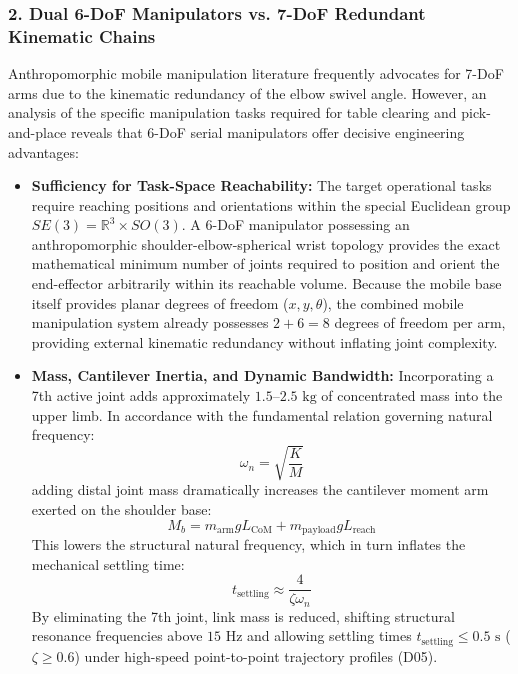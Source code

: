 \subsubsection{2. Dual 6-DoF Manipulators vs. 7-DoF Redundant Kinematic Chains}
Anthropomorphic mobile manipulation literature frequently advocates for 7-DoF arms due to the kinematic redundancy of the elbow swivel angle. However, an analysis of the specific manipulation tasks required for table clearing and pick-and-place reveals that 6-DoF serial manipulators offer decisive engineering advantages:
\begin{itemize}[leftmargin=1.5em]
  \item \textbf{Sufficiency for Task-Space Reachability:} The target operational tasks require reaching positions and orientations within the special Euclidean group $SE(3) = \mathbb{R}^3 \times SO(3)$. A 6-DoF manipulator possessing an anthropomorphic shoulder-elbow-spherical wrist topology provides the exact mathematical minimum number of joints required to position and orient the end-effector arbitrarily within its reachable volume. Because the mobile base itself provides planar degrees of freedom ($x, y, \theta$), the combined mobile manipulation system already possesses $2 + 6 = 8$ degrees of freedom per arm, providing external kinematic redundancy without inflating joint complexity.
  \item \textbf{Mass, Cantilever Inertia, and Dynamic Bandwidth:} Incorporating a 7th active joint adds approximately $1.5\text{--}2.5\text{ kg}$ of concentrated mass into the upper limb. In accordance with the fundamental relation governing natural frequency:
  \begin{equation}
    \omega_n = \sqrt{\frac{K}{M}}
  \end{equation}
  adding distal joint mass dramatically increases the cantilever moment arm exerted on the shoulder base:
  \begin{equation}
    M_b = m_{\text{arm}} g L_{\text{CoM}} + m_{\text{payload}} g L_{\text{reach}}
  \end{equation}
  This lowers the structural natural frequency, which in turn inflates the mechanical settling time:
  \begin{equation}
    t_{\text{settling}} \approx \frac{4}{\zeta \omega_n}
  \end{equation}
  By eliminating the 7th joint, link mass is reduced, shifting structural resonance frequencies above $15\text{ Hz}$ and allowing settling times $t_{\text{settling}} \le 0.5\text{ s}$ ($\zeta \ge 0.6$) under high-speed point-to-point trajectory profiles (D05).

\end{itemize}
